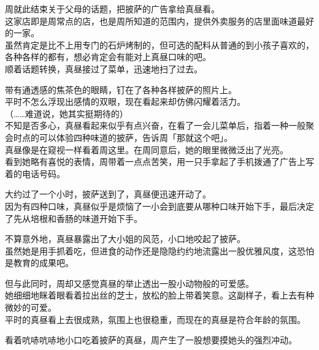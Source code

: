 周就此结束关于父母的话题，把披萨的广告拿给真昼看。\\

这家店即是周常点的店，也是周所知道的范围内，提供外卖服务的店里面味道最好的一家。\\

虽然肯定是比不上用专门的石炉烤制的，但可选的配料从普通的到小孩子喜欢的，各种各样的都有，想必肯定会有能对上真昼口味的吧。\\

顺着话题转换，真昼接过了菜单，迅速地扫了过去。

带有通透感的焦茶色的眼睛，钉在了各种各样披萨的照片上。\\

平时不怎么浮现出感情的双眼，现在看起来却仿佛闪耀着活力。\\

（……难道说，她其实挺期待的）\\

不知是否多心，真昼看起来似乎有点兴奋，在看了一会儿菜单后，指着一种一般聚会时点的可以体验四种味道的披萨，告诉周「那就这个吧」。\\

真昼像是在窥视一样看着周这里。在周同意后，她的眼里微微泛出了光亮。\\

看到她略有喜悦的表情，周带着一点点苦笑，用一只手拿起了手机拨通了广告上写着的电话号码。\\

\vspace{2\baselineskip}

大约过了一个小时，披萨送到了，真昼便迅速开动了。\\

因为有四种口味，真昼似乎是烦恼了一小会到底要从哪种口味开始下手，最后决定了先从培根和香肠的味道开始下手。

不算意外地，真昼暴露出了大小姐的风范，小口地咬起了披萨。\\

虽然她是用手抓着吃，但进食的动作还是隐隐约约地流露出一股优雅风度，这恐怕是教育的成果吧。

但与此同时，周却又感觉真昼的举止透出一股小动物般的可爱感。\\

她细细地眯着眼看着拉出丝的芝士，放松的脸上带着笑意。这副样子，看上去有种微妙的可爱。\\

平时的真昼看上去很成熟，氛围上也很稳重，而现在的真昼是符合年龄的氛围。

看着吭哧吭哧地小口吃着披萨的真昼，周产生了一股想要摸她头的强烈冲动。\\

